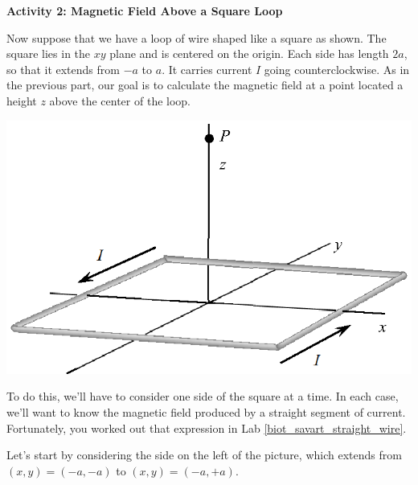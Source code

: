 \bigskip

{\bf Activity 2: Magnetic Field Above a Square Loop}

Now suppose that we have a loop of wire shaped like a square as shown.
The square lies in the $xy$ plane and is centered on the origin.
Each side has length $2a$, so that it extends from $-a$ to $a$.
It carries current $I$ going counterclockwise.  As in the previous
part, our goal is to calculate the magnetic field at a point 
located a height $z$ above the center of the loop.  

\vspace{0.4in}
\centerline{\includegraphics{biot_savart_above_loops/square_loop_3d.eps}}
\medskip


To do this, we'll have to consider one side of the square at a time.  In
each case, we'll want to know the magnetic field produced by 
a straight segment of current.  Fortunately, you worked out
that expression in Lab \ref{biot_savart_straight_wire}. 


Let's start by considering 
the side on the left of the picture, which extends from
$(x,y)=(-a,-a)$ to $(x,y)=(-a,+a)$.

